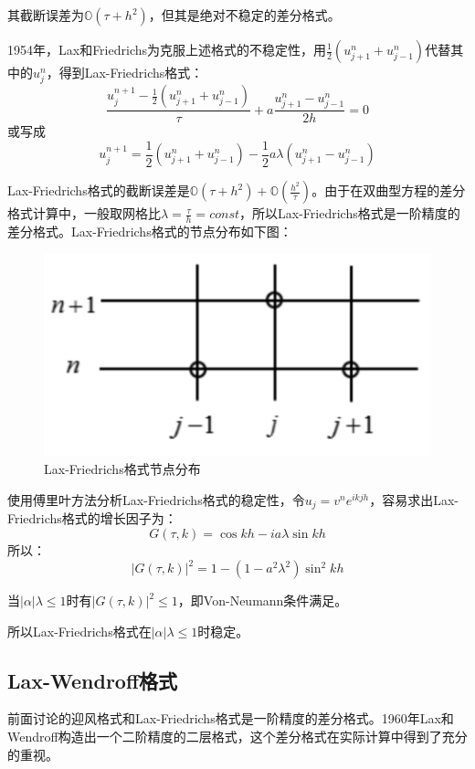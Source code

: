 \documentclass[fontset=mac]{ctexart}
\begin{document}
	其截断误差为$\mathbb{O}(\tau + h^2)$，但其是绝对不稳定的差分格式。
	
	1954年，Lax和Friedrichs为克服上述格式的不稳定性，用$\frac{1}{2}\left(u_{j+1}^{n}+u_{j-1}^{n}\right)$代替其中的$u_j^n$，得到Lax-Friedrichs格式：
	$$
	\frac{u_{j}^{n+1}-\frac{1}{2}\left(u_{j+1}^{n}+u_{j-1}^{n}\right)}{\tau}+a \frac{u_{j+1}^{n}-u_{j-1}^{n}}{2 h}=0
	$$
	或写成
	$$
	u_{j}^{n+1}=\frac{1}{2}\left(u_{j+1}^{n}+u_{j-1}^{n}\right)-\frac{1}{2} a \lambda\left(u_{j+1}^{n}-u_{j-1}^{n}\right)
	$$
	
	Lax-Friedrichs格式的截断误差是$\mathbb{O}(\tau + h^2)+\mathbb{O}(\frac{h^2}{\tau})$。由于在双曲型方程的差分格式计算中，一般取网格比$\lambda = \frac{\tau}{h} = const$，所以Lax-Friedrichs格式是一阶精度的差分格式。Lax-Friedrichs格式的节点分布如下图：
	\begin{figure}[H]
		\centering
		\includegraphics[width=0.7\linewidth]{fig/fig3}
		\caption{Lax-Friedrichs格式节点分布}
	\end{figure}
	
	使用傅里叶方法分析Lax-Friedrichs格式的稳定性，令$u_j = v^n e^{ikjh}$，容易求出Lax-Friedrichs格式的增长因子为：
	$$
	G(\tau, k)=\cos k h-i a \lambda \sin k h
	$$
	所以：
	$$
	|G(\tau, k)|^{2}=1-\left(1-a^{2} \lambda^{2}\right) \sin ^{2} k h
	$$
	
	当$|\alpha|\lambda \le 1$时有$|G(\tau , k)|^2 \le 1$，即Von-Neumann条件满足。
	
	所以Lax-Friedrichs格式在$|\alpha|\lambda \le 1$时稳定。
	
	\subsection{Lax-Wendroff格式}
	前面讨论的迎风格式和Lax-Friedrichs格式是一阶精度的差分格式。1960年Lax和Wendroff构造出一个二阶精度的二层格式，这个差分格式在实际计算中得到了充分的重视。
	
\end{document}
